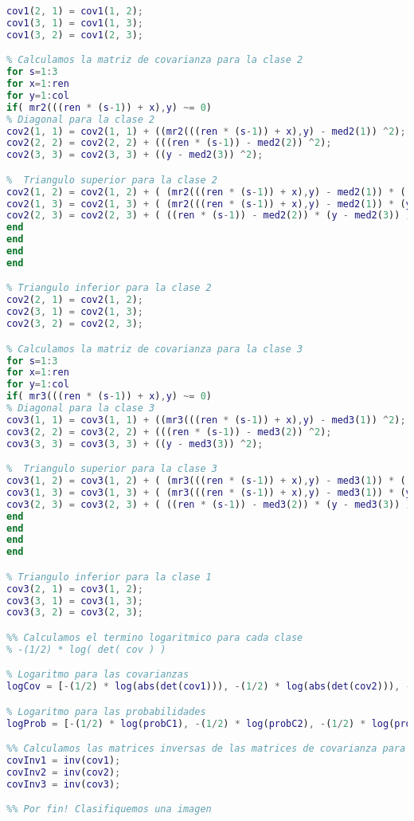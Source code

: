\documentclass[10pt,journal,compsoc]{IEEEtran}\usepackage[T1]{fontenc}                              %
\begin{document}
\begin{lstlisting}[language=Matlab,basicstyle=\small]
% Triangulo inferior para la clase 1
cov1(2, 1) = cov1(1, 2);
cov1(3, 1) = cov1(1, 3);
cov1(3, 2) = cov1(2, 3);

% Calculamos la matriz de covarianza para la clase 2
for s=1:3
for x=1:ren
for y=1:col
if( mr2(((ren * (s-1)) + x),y) ~= 0)
% Diagonal para la clase 2
cov2(1, 1) = cov2(1, 1) + ((mr2(((ren * (s-1)) + x),y) - med2(1)) ^2);
cov2(2, 2) = cov2(2, 2) + (((ren * (s-1)) - med2(2)) ^2);
cov2(3, 3) = cov2(3, 3) + ((y - med2(3)) ^2);

%  Triangulo superior para la clase 2
cov2(1, 2) = cov2(1, 2) + ( (mr2(((ren * (s-1)) + x),y) - med2(1)) * ((ren * (s-1)) - med2(2)) );
cov2(1, 3) = cov2(1, 3) + ( (mr2(((ren * (s-1)) + x),y) - med2(1)) * (y - med2(3)) );
cov2(2, 3) = cov2(2, 3) + ( ((ren * (s-1)) - med2(2)) * (y - med2(3)) );
end
end
end
end

% Triangulo inferior para la clase 2
cov2(2, 1) = cov2(1, 2);
cov2(3, 1) = cov2(1, 3);
cov2(3, 2) = cov2(2, 3);

% Calculamos la matriz de covarianza para la clase 3
for s=1:3
for x=1:ren
for y=1:col
if( mr3(((ren * (s-1)) + x),y) ~= 0)
% Diagonal para la clase 3
cov3(1, 1) = cov3(1, 1) + ((mr3(((ren * (s-1)) + x),y) - med3(1)) ^2);
cov3(2, 2) = cov3(2, 2) + (((ren * (s-1)) - med3(2)) ^2);
cov3(3, 3) = cov3(3, 3) + ((y - med3(3)) ^2);

%  Triangulo superior para la clase 3
cov3(1, 2) = cov3(1, 2) + ( (mr3(((ren * (s-1)) + x),y) - med3(1)) * ((ren * (s-1)) - med3(2)) );
cov3(1, 3) = cov3(1, 3) + ( (mr3(((ren * (s-1)) + x),y) - med3(1)) * (y - med3(3)) );
cov3(2, 3) = cov3(2, 3) + ( ((ren * (s-1)) - med3(2)) * (y - med3(3)) );
end
end
end
end

% Triangulo inferior para la clase 1
cov3(2, 1) = cov3(1, 2);
cov3(3, 1) = cov3(1, 3);
cov3(3, 2) = cov3(2, 3);

%% Calculamos el termino logaritmico para cada clase
% -(1/2) * log( det( cov ) )

% Logaritmo para las covarianzas
logCov = [-(1/2) * log(abs(det(cov1))), -(1/2) * log(abs(det(cov2))), -(1/2) * log(abs(det(cov3)))];

% Logaritmo para las probabilidades
logProb = [-(1/2) * log(probC1), -(1/2) * log(probC2), -(1/2) * log(probC3)];

%% Calculamos las matrices inversas de las matrices de covarianza para cada clase
covInv1 = inv(cov1);
covInv2 = inv(cov2);
covInv3 = inv(cov3);

%% Por fin! Clasifiquemos una imagen


\end{lstlisting}
\end{document}
